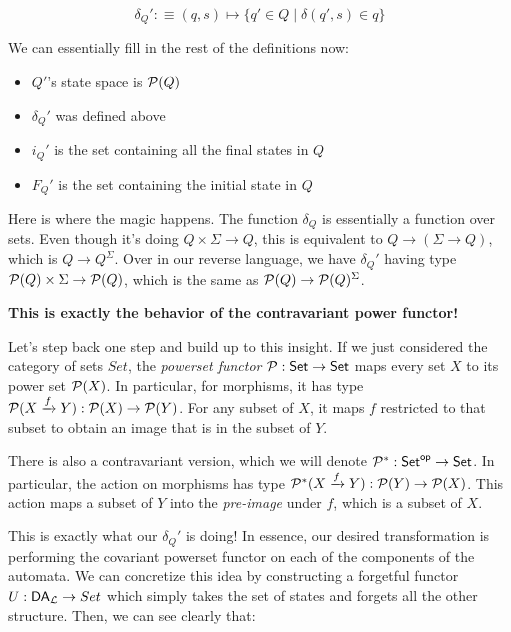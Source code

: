 \label{preImageDelta}
\begin{equation}
    \delta_Q' :\equiv (q, s) \mapsto \{q' \in Q \mid \delta(q', s) \in q\}
\end{equation}

We can essentially fill in the rest of the definitions now:

\begin{itemize}
    \item $Q'$'s state space is $\mathcal P(Q)$
    \item $\delta_Q'$ was defined above
    \item $i_Q'$ is the set containing all the final states in $Q$
    \item $F_Q'$ is the set containing the initial state in $Q$
\end{itemize}

Here is where the magic happens.
The function $\delta_Q$ is essentially a function over sets.
Even though it's doing $Q \times \Sigma \rightarrow Q$, this is equivalent to $Q \rightarrow (\Sigma \rightarrow Q)$, which is $Q \rightarrow Q^\Sigma$.
Over in our reverse language, we have $\delta_Q'$ having type $\mathcal P(Q) \times \Sigma \rightarrow \mathcal P(Q)$, which is the same as $\mathcal P(Q) \rightarrow \mathcal P(Q)^\Sigma$.

\textbf{This is exactly the behavior of the contravariant power functor!}

Let's step back one step and build up to this insight.
If we just considered the category of sets $Set$, the \emph{powerset functor} $\mathcal P : \mathsf{Set} \rightarrow \mathsf{Set}$ maps every set $X$ to its power set $\mathcal P(X)$.
In particular, for morphisms, it has type $\mathcal P(X \xrightarrow{f} Y) : \mathcal P(X) \rightarrow \mathcal P(Y)$.
For any subset of $X$, it maps $f$ restricted to that subset to obtain an image that is in the subset of $Y$.

\newcommand{\opp}[1]{#1^{\mathsf{op}}}
There is also a contravariant version, which we will denote $\calP^* : \opp{\Set} \rightarrow \Set$.
In particular, the action on morphisms has type $\mathcal P^* (X \xrightarrow{f} Y) : \mathcal P(Y) \rightarrow \mathcal P(X)$.
This action maps a subset of $Y$ into the \emph{pre-image} under $f$, which is a subset of $X$.

This is exactly what our $\delta_Q'$ is doing!
In essence, our desired transformation is performing the covariant powerset functor on each of the components of the automata.
We can concretize this idea by constructing a forgetful functor $U : \mathsf{DA}_\mathcal L \rightarrow Set$ which simply takes the set of states and forgets all the other structure.
Then, we can see clearly that:

